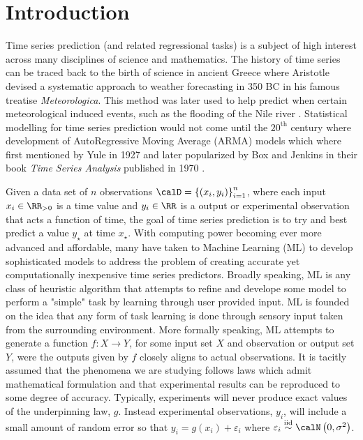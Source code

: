 \section*{Introduction}
Time series prediction (and related regressional tasks) is a subject of high interest across many disciplines of science and mathematics. The history of time series can be traced back to the birth of science in ancient Greece where Aristotle devised a systematic approach to weather forecasting in 350 BC in his famous treatise {\it Meteorologica}. This method was later used to help predict when certain meteorological induced events, such as the flooding of the Nile river \cite{10.2307/26254645}. Statistical modelling for time series prediction would not come until the $20^{\text{th}}$ century where development of AutoRegressive Moving Average (ARMA) models which where first mentioned by Yule \cite{YuleG.Udny1927OaMo} in 1927 and later popularized by Box and Jenkins in their book {\it Time Series Analysis} published in 1970 \cite{BoxGeorgeE.P.2008Tsa:}.

Given a data set of $n$ observations $\calD = \left\{ \left( x_i , y_i \right) \right\}_{i=1}^{n}$, where each input $x_i \in \RR_{>0}$ is a time value and $y_i \in \RR$ is a output or experimental observation that acts a function of time, the goal of time series prediction is to try and best predict a value $y_{\star}$ at time $x_{\star}$. With computing power becoming ever more advanced and affordable, many have taken to Machine Learning (ML) to develop sophisticated models to address the problem of creating accurate yet computationally inexpensive time series predictors. Broadly speaking, ML is any class of heuristic algorithm that attempts to refine and develope some model to perform a "simple" task by learning through user provided input. ML is founded on the idea that any form of task learning is done through sensory input taken from the surrounding environment. More formally speaking, ML attempts to generate a function $f : X \to Y$, for some input set $X$ and observation or output set $Y$, were the outputs given by $f$ closely aligns to actual observations. It is tacitly assumed  that the phenomena we are studying follows laws which admit mathematical formulation and that experimental results can be reproduced to some degree of accuracy. Typically, experiments will never produce exact values of the underpinning law, $g$. Instead experimental observations, $y_i$, will include a small amount of random error so that $y_i =  g(x_i) + \varepsilon_i$ where $\varepsilon_i \overset{\text{iid}}{\sim} \calN \left( 0, \sigma^2 \right)$.

